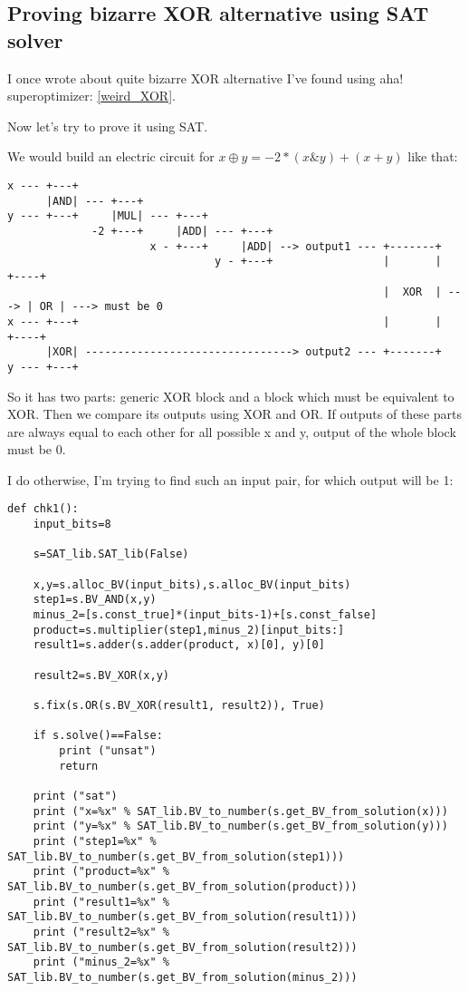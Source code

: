 \subsection{Proving bizarre XOR alternative using SAT solver}
\label{weird_XOR_SAT}

I once wrote about quite bizarre XOR alternative I've found using aha! superoptimizer: \ref{weird_XOR}.

Now let's try to prove it using SAT.

We would build an electric circuit for $x \oplus y = -2*(x \& y) + (x + y)$ like that:

\begin{lstlisting}
x --- +---+
      |AND| --- +---+     
y --- +---+     |MUL| --- +---+
             -2 +---+     |ADD| --- +---+
                      x - +---+     |ADD| --> output1 --- +-------+
                                y - +---+                 |       |      +----+
                                                          |  XOR  | ---> | OR | ---> must be 0
x --- +---+                                               |       |      +----+
      |XOR| --------------------------------> output2 --- +-------+
y --- +---+
\end{lstlisting}

So it has two parts: generic XOR block and a block which must be equivalent to XOR.
Then we compare its outputs using XOR and OR.
If outputs of these parts are always equal to each other for all possible x and y, output of the whole block must be 0.

I do otherwise, I'm trying to find such an input pair, for which output will be 1:

\begin{lstlisting}
def chk1():
    input_bits=8

    s=SAT_lib.SAT_lib(False)

    x,y=s.alloc_BV(input_bits),s.alloc_BV(input_bits)
    step1=s.BV_AND(x,y)
    minus_2=[s.const_true]*(input_bits-1)+[s.const_false]
    product=s.multiplier(step1,minus_2)[input_bits:]
    result1=s.adder(s.adder(product, x)[0], y)[0]

    result2=s.BV_XOR(x,y)

    s.fix(s.OR(s.BV_XOR(result1, result2)), True)

    if s.solve()==False:
        print ("unsat")
        return

    print ("sat")
    print ("x=%x" % SAT_lib.BV_to_number(s.get_BV_from_solution(x)))
    print ("y=%x" % SAT_lib.BV_to_number(s.get_BV_from_solution(y)))
    print ("step1=%x" % SAT_lib.BV_to_number(s.get_BV_from_solution(step1)))
    print ("product=%x" % SAT_lib.BV_to_number(s.get_BV_from_solution(product)))
    print ("result1=%x" % SAT_lib.BV_to_number(s.get_BV_from_solution(result1)))
    print ("result2=%x" % SAT_lib.BV_to_number(s.get_BV_from_solution(result2)))
    print ("minus_2=%x" % SAT_lib.BV_to_number(s.get_BV_from_solution(minus_2)))
\end{lstlisting}

